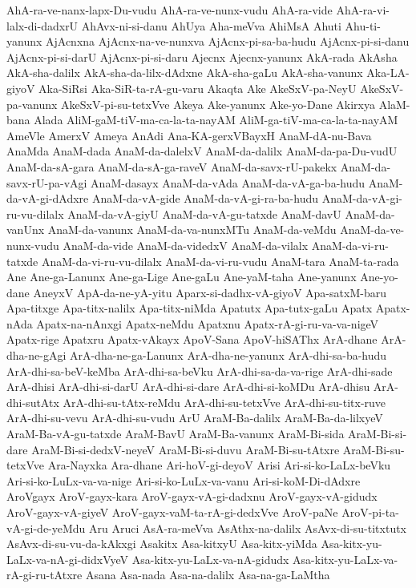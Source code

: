 {AhA-ra-ve-nanx-lapx-Du-vudu
AhA-ra-ve-nunx-vudu
AhA-ra-vide
AhA-ra-vi-lalx-di-dadxrU
AhAvx-ni-si-danu
AhUya
Aha-meVva
AhiMsA
Ahuti
Ahu-ti-yanunx
AjAcnxna
AjAcnx-na-ve-nunxva
AjAcnx-pi-sa-ba-hudu
AjAcnx-pi-si-danu
AjAcnx-pi-si-darU
AjAcnx-pi-si-daru
Ajecnx
Ajecnx-yanunx
AkA-rada
AkAsha
AkA-sha-dalilx
AkA-sha-da-lilx-dAdxne
AkA-sha-gaLu
AkA-sha-vanunx
Aka-LA-giyoV
Aka-SiRsi
Aka-SiR-ta-rA-gu-varu
Akaqta
Ake
AkeSxV-pa-NeyU
AkeSxV-pa-vanunx
AkeSxV-pi-su-tetxVve
Akeya
Ake-yanunx
Ake-yo-Dane
Akirxya
AlaM-bana
Alada
AliM-gaM-tiV-ma-ca-la-ta-nayAM
AliM-ga-tiV-ma-ca-la-ta-nayAM
AmeVle
AmerxV
Ameya
AnAdi
Ana-KA-gerxVBayxH
AnaM-dA-nu-Bava
AnaMda
AnaM-dada
AnaM-da-dalelxV
AnaM-da-dalilx
AnaM-da-pa-Du-vudU
AnaM-da-sA-gara
AnaM-da-sA-ga-raveV
AnaM-da-savx-rU-pakekx
AnaM-da-savx-rU-pa-vAgi
AnaM-dasayx
AnaM-da-vAda
AnaM-da-vA-ga-ba-hudu
AnaM-da-vA-gi-dAdxre
AnaM-da-vA-gide
AnaM-da-vA-gi-ra-ba-hudu
AnaM-da-vA-gi-ru-vu-dilalx
AnaM-da-vA-giyU
AnaM-da-vA-gu-tatxde
AnaM-davU
AnaM-da-vanUnx
AnaM-da-vanunx
AnaM-da-va-nunxMTu
AnaM-da-veMdu
AnaM-da-ve-nunx-vudu
AnaM-da-vide
AnaM-da-videdxV
AnaM-da-vilalx
AnaM-da-vi-ru-tatxde
AnaM-da-vi-ru-vu-dilalx
AnaM-da-vi-ru-vudu
AnaM-tara
AnaM-ta-rada
Ane
Ane-ga-Lanunx
Ane-ga-Lige
Ane-gaLu
Ane-yaM-taha
Ane-yanunx
Ane-yo-dane
AneyxV
ApA-da-ne-yA-yitu
Aparx-si-dadhx-vA-giyoV
Apa-satxM-baru
Apa-titxge
Apa-titx-nalilx
Apa-titx-niMda
Apatutx
Apa-tutx-gaLu
Apatx
Apatx-nAda
Apatx-na-nAnxgi
Apatx-neMdu
Apatxnu
Apatx-rA-gi-ru-va-va-nigeV
Apatx-rige
Apatxru
Apatx-vAkayx
ApoV-Sana
ApoV-hiSAThx
ArA-dhane
ArA-dha-ne-gAgi
ArA-dha-ne-ga-Lanunx
ArA-dha-ne-yanunx
ArA-dhi-sa-ba-hudu
ArA-dhi-sa-beV-keMba
ArA-dhi-sa-beVku
ArA-dhi-sa-da-va-rige
ArA-dhi-sade
ArA-dhisi
ArA-dhi-si-darU
ArA-dhi-si-dare
ArA-dhi-si-koMDu
ArA-dhisu
ArA-dhi-sutAtx
ArA-dhi-su-tAtx-reMdu
ArA-dhi-su-tetxVve
ArA-dhi-su-titx-ruve
ArA-dhi-su-vevu
ArA-dhi-su-vudu
ArU
AraM-Ba-dalilx
AraM-Ba-da-lilxyeV
AraM-Ba-vA-gu-tatxde
AraM-BavU
AraM-Ba-vanunx
AraM-Bi-sida
AraM-Bi-si-dare
AraM-Bi-si-dedxV-neyeV
AraM-Bi-si-duvu
AraM-Bi-su-tAtxre
AraM-Bi-su-tetxVve
Ara-Nayxka
Ara-dhane
Ari-hoV-gi-deyoV
Arisi
Ari-si-ko-LaLx-beVku
Ari-si-ko-LuLx-va-va-nige
Ari-si-ko-LuLx-va-vanu
Ari-si-koM-Di-dAdxre
AroVgayx
AroV-gayx-kara
AroV-gayx-vA-gi-dadxnu
AroV-gayx-vA-gidudx
AroV-gayx-vA-giyeV
AroV-gayx-vaM-ta-rA-gi-dedxVve
AroV-paNe
AroV-pi-ta-vA-gi-de-yeMdu
Aru
Aruci
AsA-ra-meVva
AsAthx-na-dalilx
AsAvx-di-su-titxtutx
AsAvx-di-su-vu-da-kAkxgi
Asakitx
Asa-kitxyU
Asa-kitx-yiMda
Asa-kitx-yu-LaLx-va-nA-gi-didxVyeV
Asa-kitx-yu-LaLx-va-nA-gidudx
Asa-kitx-yu-LaLx-va-rA-gi-ru-tAtxre
Asana
Asa-nada
Asa-na-dalilx
Asa-na-ga-LaMtha
}
